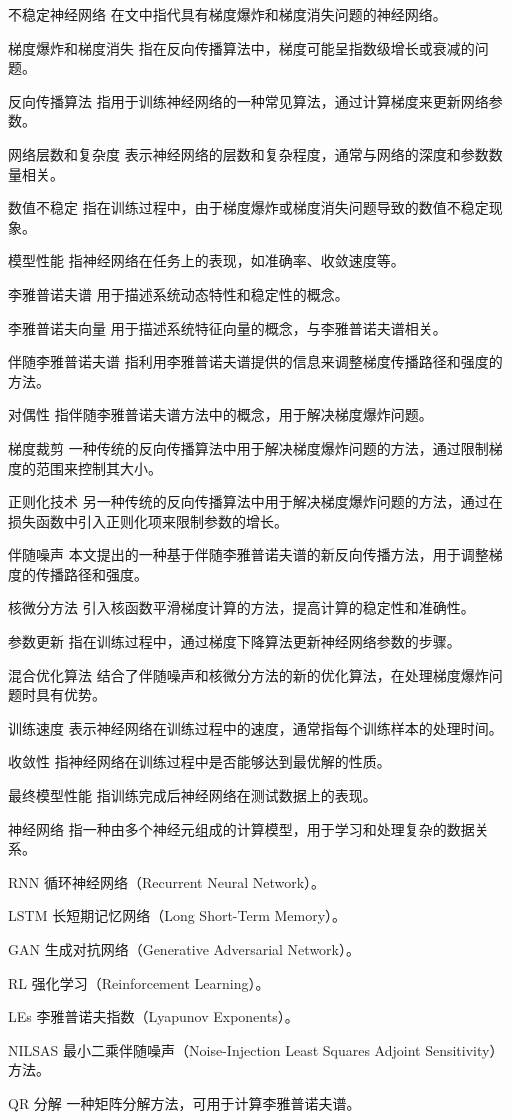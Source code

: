 
\begin{denotation}[3cm]
  \item[不稳定神经网络] 在文中指代具有梯度爆炸和梯度消失问题的神经网络。
  \item[梯度爆炸和梯度消失] 指在反向传播算法中，梯度可能呈指数级增长或衰减的问题。
  \item[反向传播算法] 指用于训练神经网络的一种常见算法，通过计算梯度来更新网络参数。
  \item[网络层数和复杂度] 表示神经网络的层数和复杂程度，通常与网络的深度和参数数量相关。
  \item[数值不稳定] 指在训练过程中，由于梯度爆炸或梯度消失问题导致的数值不稳定现象。
  \item[模型性能] 指神经网络在任务上的表现，如准确率、收敛速度等。
  \item[李雅普诺夫谱] 用于描述系统动态特性和稳定性的概念。
  \item[李雅普诺夫向量] 用于描述系统特征向量的概念，与李雅普诺夫谱相关。
  \item[伴随李雅普诺夫谱] 指利用李雅普诺夫谱提供的信息来调整梯度传播路径和强度的方法。
  \item[对偶性] 指伴随李雅普诺夫谱方法中的概念，用于解决梯度爆炸问题。
  \item[梯度裁剪] 一种传统的反向传播算法中用于解决梯度爆炸问题的方法，通过限制梯度的范围来控制其大小。
  \item[正则化技术] 另一种传统的反向传播算法中用于解决梯度爆炸问题的方法，通过在损失函数中引入正则化项来限制参数的增长。
  \item[伴随噪声] 本文提出的一种基于伴随李雅普诺夫谱的新反向传播方法，用于调整梯度的传播路径和强度。
  \item[核微分方法] 引入核函数平滑梯度计算的方法，提高计算的稳定性和准确性。
  \item[参数更新] 指在训练过程中，通过梯度下降算法更新神经网络参数的步骤。
  \item[混合优化算法] 结合了伴随噪声和核微分方法的新的优化算法，在处理梯度爆炸问题时具有优势。
  \item[训练速度] 表示神经网络在训练过程中的速度，通常指每个训练样本的处理时间。
  \item[收敛性] 指神经网络在训练过程中是否能够达到最优解的性质。
  \item[最终模型性能] 指训练完成后神经网络在测试数据上的表现。
  \item[神经网络] 指一种由多个神经元组成的计算模型，用于学习和处理复杂的数据关系。
  \item[RNN] 循环神经网络（Recurrent Neural Network）。
  \item[LSTM] 长短期记忆网络（Long Short-Term Memory）。
  \item[GAN] 生成对抗网络（Generative Adversarial Network）。
  \item[RL] 强化学习（Reinforcement Learning）。
  \item[LEs] 李雅普诺夫指数（Lyapunov Exponents）。
  \item[NILSAS] 最小二乘伴随噪声（Noise-Injection Least Squares Adjoint Sensitivity）方法。
  \item[QR 分解] 一种矩阵分解方法，可用于计算李雅普诺夫谱。
\end{denotation}
